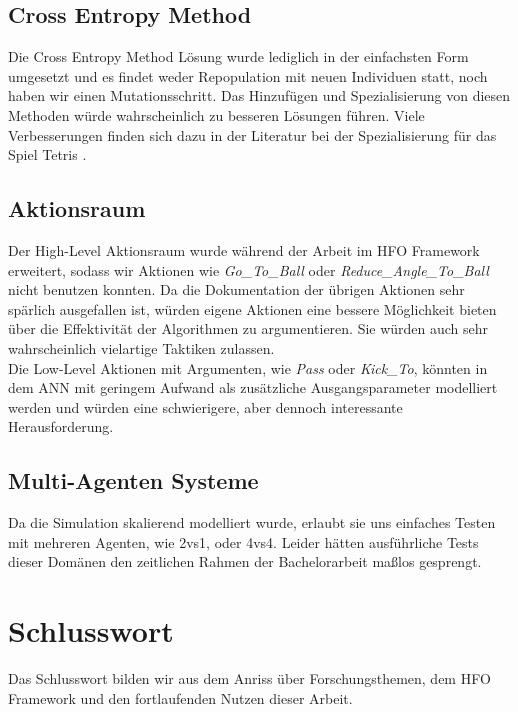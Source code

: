 
        \subsection*{Cross Entropy Method}
            Die Cross Entropy Method Lösung wurde lediglich in der einfachsten Form umgesetzt und es findet weder Repopulation mit neuen Individuen statt, noch haben wir einen Mutationsschritt. Das Hinzufügen und Spezialisierung von diesen Methoden würde wahrscheinlich zu besseren Lösungen führen. Viele Verbesserungen finden sich dazu in der Literatur bei der Spezialisierung für das Spiel Tetris \cite{cem}.

        \subsection*{Aktionsraum}
            Der High-Level Aktionsraum wurde während der Arbeit im HFO Framework erweitert, sodass wir Aktionen wie \textit{Go\_To\_Ball} oder \textit{Reduce\_Angle\_To\_Ball} nicht benutzen konnten. Da die Dokumentation der übrigen Aktionen sehr spärlich ausgefallen ist, würden eigene Aktionen eine bessere Möglichkeit bieten über die Effektivität der Algorithmen zu argumentieren. Sie würden auch sehr wahrscheinlich vielartige Taktiken zulassen. \\

            \noindent
            Die Low-Level Aktionen mit Argumenten, wie \textit{Pass} oder \textit{Kick\_To}, könnten in dem ANN mit geringem Aufwand als zusätzliche Ausgangsparameter modelliert werden und würden eine schwierigere, aber dennoch interessante Herausforderung.


        \subsection*{Multi-Agenten Systeme}
            Da die Simulation skalierend modelliert wurde, erlaubt sie uns einfaches Testen mit mehreren Agenten, wie 2vs1, oder 4vs4. Leider hätten ausführliche Tests dieser Domänen den zeitlichen Rahmen der Bachelorarbeit maßlos gesprengt. 

\newpage

    \section{Schlusswort}
        Das Schlusswort bilden wir aus dem Anriss über Forschungsthemen, dem HFO Framework und den fortlaufenden Nutzen dieser Arbeit.

